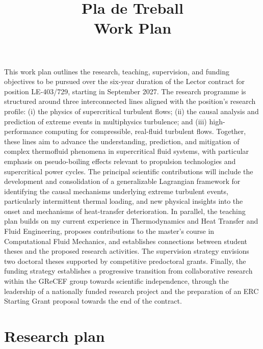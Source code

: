 \documentclass[11pt]{article}
\title{\textbf{Pla de Treball}\\[2pt]\large Work Plan}
\author{\Large \CandName}
\date{}
\begin{document}
\maketitle
\thispagestyle{plain}
\vspace{0.5cm}
\begin{center}\postdata\end{center}

This work plan outlines the research, teaching, supervision, and funding objectives to be pursued over the six-year duration of the Lector contract for position LE-403/729, starting in September 2027.
The research programme is structured around three interconnected lines aligned with the position's research profile: (i) the physics of supercritical turbulent flows; (ii) the causal analysis and prediction of extreme events in multiphysics turbulence; and (iii) high-performance computing for compressible, real-fluid turbulent flows. Together, these lines aim to advance the understanding, prediction, and mitigation of complex thermofluid phenomena in supercritical fluid systems, with particular emphasis on pseudo-boiling effects relevant to propulsion technologies and supercritical power cycles. The principal scientific contributions will include the development and consolidation of a generalizable Lagrangian framework for identifying the causal mechanisms underlying extreme turbulent events, particularly intermittent thermal loading, and new physical insights into the onset and mechanisms of heat-transfer deterioration.
In parallel, the teaching plan builds on my current experience in Thermodynamics and Heat Transfer and Fluid Engineering, proposes contributions to the master's course in Computational Fluid Mechanics, and establishes connections between student theses and the proposed research activities. The supervision strategy envisions two doctoral theses supported by competitive predoctoral grants. Finally, the funding strategy establishes a progressive transition from collaborative research within the GReCEF group towards scientific independence, through the leadership of a nationally funded research project and the preparation of an ERC Starting Grant proposal towards the end of the contract.

\newpage
\tableofcontents

\section{Research plan}\label{sec:research}
\end{document}

